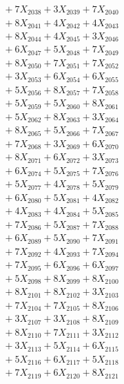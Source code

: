 \documentclass[a4paper,10pt]{article}
\begin{document}
{\begin{align}
&\;  + 7 X_{2038} + 3 X_{2039} + 7 X_{2040} \\[0.3ex]
&\;  + 8 X_{2041} + 4 X_{2042} + 4 X_{2043} \\[0.3ex]
&\;  + 8 X_{2044} + 4 X_{2045} + 3 X_{2046} \\[0.3ex]
&\;  + 6 X_{2047} + 5 X_{2048} + 7 X_{2049} \\[0.5ex]\allowbreak
&\;  + 8 X_{2050} + 7 X_{2051} + 7 X_{2052} \\[0.3ex]
&\;  + 3 X_{2053} + 6 X_{2054} + 6 X_{2055} \\[0.3ex]
&\;  + 5 X_{2056} + 8 X_{2057} + 7 X_{2058} \\[0.3ex]
&\;  + 5 X_{2059} + 5 X_{2060} + 8 X_{2061} \\[0.3ex]
&\;  + 5 X_{2062} + 8 X_{2063} + 3 X_{2064} \\[0.3ex]
&\;  + 8 X_{2065} + 5 X_{2066} + 7 X_{2067} \\[0.3ex]
&\;  + 7 X_{2068} + 3 X_{2069} + 6 X_{2070} \\[0.3ex]
&\;  + 8 X_{2071} + 6 X_{2072} + 3 X_{2073} \\[0.3ex]
&\;  + 6 X_{2074} + 5 X_{2075} + 7 X_{2076} \\[0.3ex]
&\;  + 5 X_{2077} + 4 X_{2078} + 5 X_{2079} \\[0.5ex]\allowbreak
&\;  + 6 X_{2080} + 5 X_{2081} + 4 X_{2082} \\[0.3ex]
&\;  + 4 X_{2083} + 4 X_{2084} + 5 X_{2085} \\[0.3ex]
&\;  + 7 X_{2086} + 5 X_{2087} + 7 X_{2088} \\[0.3ex]
&\;  + 6 X_{2089} + 5 X_{2090} + 7 X_{2091} \\[0.3ex]
&\;  + 7 X_{2092} + 4 X_{2093} + 7 X_{2094} \\[0.3ex]
&\;  + 7 X_{2095} + 6 X_{2096} + 6 X_{2097} \\[0.3ex]
&\;  + 5 X_{2098} + 8 X_{2099} + 8 X_{2100} \\[0.3ex]
&\;  + 8 X_{2101} + 8 X_{2102} + 3 X_{2103} \\[0.3ex]
&\;  + 7 X_{2104} + 7 X_{2105} + 8 X_{2106} \\[0.3ex]
&\;  + 3 X_{2107} + 3 X_{2108} + 8 X_{2109} \\[0.5ex]\allowbreak
&\;  + 8 X_{2110} + 7 X_{2111} + 3 X_{2112} \\[0.3ex]
&\;  + 3 X_{2113} + 5 X_{2114} + 6 X_{2115} \\[0.3ex]
&\;  + 5 X_{2116} + 6 X_{2117} + 5 X_{2118} \\[0.3ex]
&\;  + 7 X_{2119} + 6 X_{2120} + 8 X_{2121} \\[0.3ex]

\end{align}}
\end{document}
